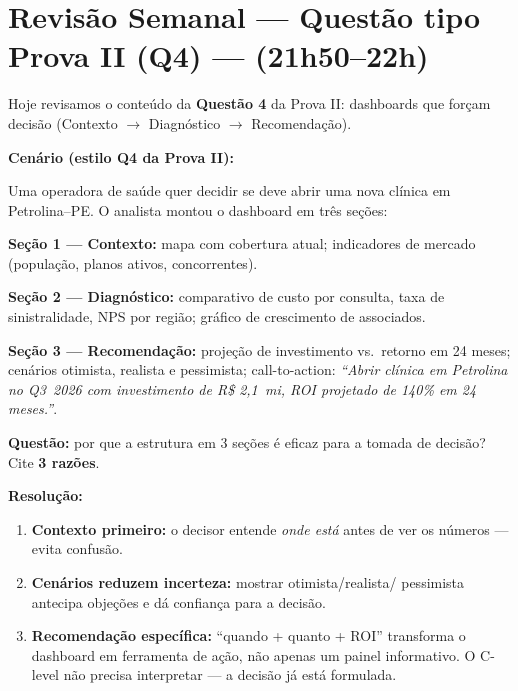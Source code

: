 \section{Revisão Semanal — Questão tipo Prova II (Q4) — (21h50–22h)}

\begin{NoteBox}
Hoje revisamos o conteúdo da \textbf{Questão 4} da Prova II:
dashboards que forçam decisão (Contexto $\to$ Diagnóstico $\to$ Recomendação).
\end{NoteBox}

\begin{SolvedBox}
\textbf{Cenário (estilo Q4 da Prova II):}

Uma operadora de saúde quer decidir se deve abrir uma nova clínica em
Petrolina--PE. O analista montou o dashboard em três seções:

\textbf{Seção 1 — Contexto:} mapa com cobertura atual; indicadores de
mercado (população, planos ativos, concorrentes).

\textbf{Seção 2 — Diagnóstico:} comparativo de custo por consulta, taxa
de sinistralidade, NPS por região; gráfico de crescimento de associados.

\textbf{Seção 3 — Recomendação:} projeção de investimento vs.\ retorno
em 24 meses; cenários otimista, realista e pessimista; call-to-action:
\textit{``Abrir clínica em Petrolina no Q3~2026 com investimento de
R\$ 2,1~mi, ROI projetado de 140\% em 24 meses.''}.

\textbf{Questão:} por que a estrutura em 3 seções é eficaz para a tomada
de decisão? Cite \textbf{3 razões}.

\textbf{Resolução:}
\begin{enumerate}
  \item \textbf{Contexto primeiro:} o decisor entende \emph{onde está} antes
  de ver os números — evita confusão.
  \item \textbf{Cenários reduzem incerteza:} mostrar otimista/realista/
  pessimista antecipa objeções e dá confiança para a decisão.
  \item \textbf{Recomendação específica:} ``quando + quanto + ROI'' transforma
  o dashboard em ferramenta de ação, não apenas um painel informativo.
  O C-level não precisa interpretar — a decisão já está formulada.
\end{enumerate}
\end{SolvedBox}


